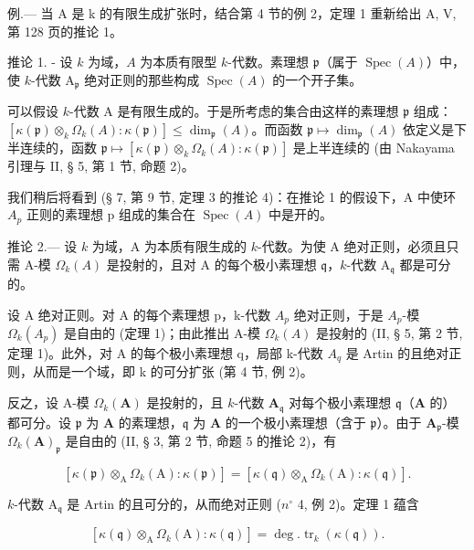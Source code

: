 例.--- 当 A 是 k 的有限生成扩张时，结合第 4 节的例 2，定理 1 重新给出 A, V, 第 128 页的推论 1。

推论 1. - 设 \(k\) 为域，\(A\) 为本质有限型 \(k\)-代数。素理想 \(\mathfrak{p}\)（属于 \(\operatorname{Spec}(A)\)）中，使 \(k\)-代数 \(\mathrm{A}_{\mathfrak{p}}\) 绝对正则的那些构成 \(\operatorname{Spec}(A)\) 的一个开子集。

可以假设 \(k\)-代数 A 是有限生成的。于是所考虑的集合由这样的素理想 \(\mathfrak{p}\) 组成：\([\kappa(\mathfrak{p}) \otimes_k \Omega_k(A) : \kappa(\mathfrak{p})] \leqslant \dim_{\mathfrak{p}}(A)\)。而函数 \(\mathfrak{p} \mapsto \dim_{\mathfrak{p}}(A)\) 依定义是下半连续的，函数 \(\mathfrak{p} \mapsto [\kappa(\mathfrak{p}) \otimes_k \Omega_k(A) : \kappa(\mathfrak{p})]\) 是上半连续的 (由 Nakayama 引理与 II, § 5, 第 1 节, 命题 2)。

我们稍后将看到 (§ 7, 第 9 节, 定理 3 的推论 4)：在推论 1 的假设下，A 中使环 \(A_{p}\) 正则的素理想 p 组成的集合在 \(\operatorname{Spec}(A)\) 中是开的。

推论 2.--- 设 \(k\) 为域，A 为本质有限生成的 \(k\)-代数。为使 A 绝对正则，必须且只需 A-模 \(\Omega_{k}(A)\) 是投射的，且对 A 的每个极小素理想 \(\mathfrak{q}\)，\(k\)-代数 \(\mathrm{A}_{\mathfrak{q}}\) 都是可分的。

设 A 绝对正则。对 A 的每个素理想 p，k-代数 \(A_{p}\) 绝对正则，于是 \(A_{p}\)-模 \(\Omega_{k}(A_{p})\) 是自由的 (定理 1)；由此推出 A-模 \(\Omega_{k}(A)\) 是投射的 (II, § 5, 第 2 节, 定理 1)。此外，对 A 的每个极小素理想 q，局部 k-代数 \(A_{q}\) 是 Artin 的且绝对正则，从而是一个域，即 k 的可分扩张 (第 4 节, 例 2)。

反之，设 A-模 \(\Omega_{k}(\mathbf{A})\) 是投射的，且 \(k\)-代数 \(\mathbf{A}_{\mathfrak{q}}\) 对每个极小素理想 \(\mathfrak{q}\)（\(\mathbf{A}\) 的）都可分。设 \(\mathfrak{p}\) 为 \(\mathbf{A}\) 的素理想，\(\mathfrak{q}\) 为 \(\mathbf{A}\) 的一个极小素理想（含于 \(\mathfrak{p}\)）。由于 \(\mathbf{A}_{\mathfrak{p}}\)-模 \(\Omega_{k}(\mathbf{A})_{\mathfrak{p}}\) 是自由的 (II, § 3, 第 2 节, 命题 5 的推论 2)，有

\[
[ \kappa (\mathfrak {p}) \otimes_ {\mathrm{A}} \Omega_ {k} (\mathrm{A}): \kappa (\mathfrak {p}) ] = [ \kappa (\mathfrak {q}) \otimes_ {\mathrm{A}} \Omega_ {k} (\mathrm{A}): \kappa (\mathfrak {q}) ].
\]

\(k\)-代数 \(\mathrm{A}_{\mathfrak{q}}\) 是 Artin 的且可分的，从而绝对正则 (\(n^{\circ}\) 4, 例 2)。定理 1 蕴含

\[
[ \kappa (\mathfrak {q}) \otimes_ {\mathrm{A}} \Omega_ {k} (\mathrm{A}): \kappa (\mathfrak {q}) ] = \deg . \operatorname{tr} _ {k} (\kappa (\mathfrak {q})).
\]

